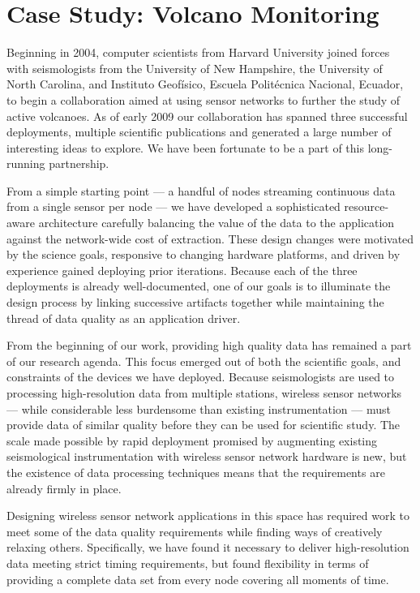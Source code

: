 \chapter{Case Study: Volcano Monitoring}
\label{chapter-background}


Beginning in 2004, computer scientists from Harvard University joined forces
with seismologists from the University of New Hampshire, the University of
North Carolina, and Instituto Geof\'{i}sico, Escuela Polit\'{e}cnica
Nacional, Ecuador, to begin a collaboration aimed at using sensor networks to
further the study of active volcanoes. As of early 2009 our collaboration has
spanned three successful deployments, multiple scientific publications and
generated a large number of interesting ideas to explore.  We have been
fortunate to be a part of this long-running partnership.

From a simple starting point --- a handful of nodes streaming continuous data
from a single sensor per node --- we have developed a sophisticated
resource-aware architecture carefully balancing the value of the data to the
application against the network-wide cost of extraction. These design changes
were motivated by the science goals, responsive to changing hardware
platforms, and driven by experience gained deploying prior iterations.
Because each of the three deployments is already well-documented, one of our
goals is to illuminate the design process by linking successive artifacts
together while maintaining the thread of data quality as an application
driver.

From the beginning of our work, providing high quality data has remained a
part of our research agenda. This focus emerged out of both the scientific
goals, and constraints of the devices we have deployed. Because seismologists
are used to processing high-resolution data from multiple stations, wireless
sensor networks --- while considerable less burdensome than existing
instrumentation --- must provide data of similar quality before they can be
used for scientific study.  The scale made possible by rapid deployment
promised by augmenting existing seismological instrumentation with wireless
sensor network hardware is new, but the existence of data processing
techniques means that the requirements are already firmly in place.

Designing wireless sensor network applications in this space has required
work to meet some of the data quality requirements while finding ways of
creatively relaxing others.  Specifically, we have found it necessary to
deliver high-resolution data meeting strict timing requirements, but found
flexibility in terms of providing a complete data set from every node
covering all moments of time.

